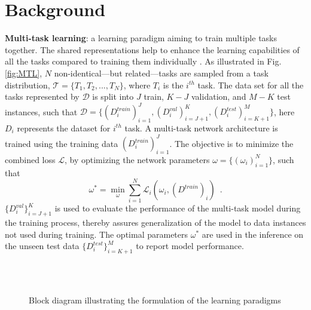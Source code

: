 \documentclass[conference]{IEEEtran}
\begin{document}
 
\section{Background} \label{formulation}
\textbf{Multi-task learning}: a learning paradigm aiming to train multiple tasks together.
The shared representations help to enhance the learning capabilities of all the tasks compared to training them individually \cite{maurer2016benefit}.
As illustrated in Fig. \ref{fig:MTL}, $N$ non-identical---but related---tasks are sampled from a task distribution, $\mathcal{T} = \{T_1, T_2,...,T_N\}$, where $T_i$ is the $i^{th}$ task.
The data set for all the tasks represented by $\mathcal{D}$ is split into $J$ train, $K-J$ validation, and $M-K$ test instances, such that  $\mathcal{D} = \{(D_i^{train})_{i=1}^J, (D_i^{val})_{i = J+1}^K,(D_i^{test})_{i = K+1}^M\}$, here $D_i$ represents the dataset for $i^{th}$ task.
A multi-task network architecture is trained using the training data $(D_i^{train})_{i=1}^J$.
The objective is to minimize the combined loss $\mathcal{L}$, by optimizing the network parameters $\omega=\{(\omega_i)_{i=1}^N\}$, such that
\begin{equation}
\omega^* = \min_{\omega} \sum_{i=1}^N \mathcal{L}_i(\omega_i, (D^{train})_i)\enspace.
\end{equation}
$\{D^{val}_i\}_{i=J+1}^K$ is used to evaluate the performance of the multi-task model during the training process, thereby assures generalization of the model to data instances not used during training.
The optimal parameters $\omega^*$ are used in the inference on the unseen test data $\{D^{test}_i\}_{i=K+1}^M$ to report model performance. 






\begin{figure}[ht]
  \centering
   \\
  \\
  \caption{Block diagram illustrating the formulation of the learning paradigms} \label{fig:block_diag}
 \vspace{-0.7cm}
\end{figure}
\end{document}
